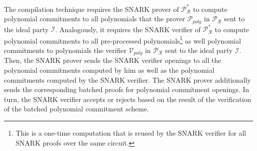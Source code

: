 The compilation technique requires the SNARK prover of  $\mathscr{P}^*_{\mathcal{R}}$ to compute 
polynomial commitments to all polynomials that the prover $\mathcal{P}_{poly}$ in $\mathscr{P}_{\mathcal{R}}$ sent to the ideal party $\mathcal{I}$. Analogously, 
it requires the SNARK verifier of $\mathscr{P}^*_{\mathcal{R}}$ to compute polynomial commitments to all pre-processed polynomials\footnote{This is a one-time computation that is 
reused by the SNARK verifier for all SNARK proofs over the same circuit.} as well polynomial commitments to polynomials the verifier $\mathcal{V}_{poly}$ 
in $\mathscr{P}_{\mathcal{R}}$ sent to the ideal party $\mathcal{I}$. Then, the SNARK prover sends the SNARK verifier openings to 
all the polynomial commitments computed by him as well as the polynomial commitments computed by the SNARK verifier. The SNARK 
prover additionally sends the corresponding batched proofs for polynomial commitment openings. In turn, the SNARK verifier accepts or rejects based 
on the result of the verification of the batched polynomial commitment scheme. \\

